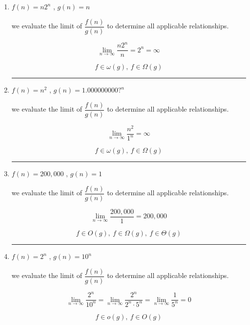\begin{enumerate}[label=\arabic*.]
    \[
        \boxed{f \in O(g),\ f \in o(g)}
    \]

    \medskip
    \begin{center}
        \rule{0.3\linewidth}{0.2pt}
    \end{center}
    \medskip

    \item $f(n)=n2^n$ , $g(n)=n$

    we evaluate the limit of $\dfrac{f(n)}{g(n)}$ to determine all applicable relationships.

    \[
        \lim_{n \to \infty} \frac{n2^n}{n} = 2^n = \infty
    \]

    \[
        \boxed{f \in \omega(g),\ f \in \Omega(g)}
    \]

    \medskip
    \begin{center}
        \rule{0.3\linewidth}{0.2pt}
    \end{center}
    \medskip

    \item $f(n)=n^2$ , $g(n)=1.000000000?^n$

    we evaluate the limit of $\dfrac{f(n)}{g(n)}$ to determine all applicable relationships.

    \[
        \lim_{n \to \infty} \frac{n^2}{1^n} = \infty
    \]

    \[
        \boxed{f \in \omega(g),\ f \in \Omega(g)}
    \]

    \medskip
    \begin{center}
        \rule{0.3\linewidth}{0.2pt}
    \end{center}
    \medskip

    \item $f(n)=200{,}000$ , $g(n)=1$

    we evaluate the limit of $\dfrac{f(n)}{g(n)}$ to determine all applicable relationships.

    \[
        \lim_{n \to \infty} \frac{200{,}000}{1} = 200{,}000
    \]

    \[
        \boxed{f \in O(g),\ f \in \Omega(g),\ f \in \Theta(g)}
    \]

    \medskip
    \begin{center}
        \rule{0.3\linewidth}{0.2pt}
    \end{center}
    \medskip

    \item $f(n)=2^n$ , $g(n)=10^n$

    we evaluate the limit of $\dfrac{f(n)}{g(n)}$ to determine all applicable relationships.

    \[
        \lim_{n \to \infty} \frac{2^n}{10^n} = \lim_{n \to \infty} \frac{2^n}{2^n \cdot 5^n} = \lim_{n \to \infty} \frac{1}{5^n} = 0
    \]

    \[
        \boxed{f \in o(g),\ f \in O(g)}
    \]
\end{enumerate}


